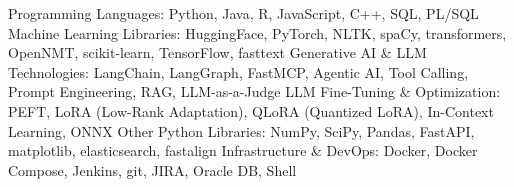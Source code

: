 \begin{cvskills}
  \cvskill
    {Programming Languages:}
    {Python, Java, R, JavaScript, C++, SQL, PL/SQL}
  \cvskill
    {Machine Learning Libraries:}
        {HuggingFace, PyTorch, NLTK, spaCy, transformers, OpenNMT, scikit-learn, TensorFlow, fasttext}
  \cvskill
    {Generative AI \& LLM Technologies:}
    {LangChain, LangGraph, FastMCP, Agentic AI, Tool Calling, Prompt Engineering, RAG, LLM-as-a-Judge}
  \cvskill
    {LLM Fine-Tuning \& Optimization:}
    {PEFT, LoRA (Low-Rank Adaptation), QLoRA (Quantized LoRA), In-Context Learning, ONNX}
  \cvskill
    {Other Python Libraries:}
    {NumPy, SciPy, Pandas, FastAPI, matplotlib, elasticsearch, fastalign}
  \cvskill
    {Infrastructure \& DevOps:}
    {Docker, Docker Compose, Jenkins, git, JIRA, Oracle DB, Shell}
\end{cvskills}